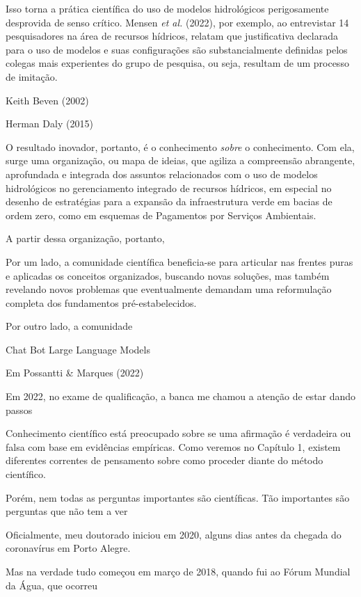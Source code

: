 \documentclass[./main.tex]{subfiles}
\begin{document}
Isso torna a prática científica do uso de modelos hidrológicos perigosamente desprovida de senso crítico. Mensen \textit{et al.} (2022), por exemplo, ao entrevistar 14 pesquisadores na área de recursos hídricos, relatam que justificativa declarada para o uso de modelos e suas configurações são substancialmente definidas pelos colegas mais experientes do grupo de pesquisa, ou seja, resultam de um processo de imitação.

Keith Beven (2002)\cite{Beven2002a}

Herman Daly (2015) \cite{Daly2015a}


O resultado inovador, portanto, é o conhecimento \textit{sobre} o conhecimento. Com ela, surge uma organização, ou mapa de ideias, que agiliza a compreensão abrangente, aprofundada e integrada dos assuntos relacionados com o uso de modelos hidrológicos no gerenciamento integrado de recursos hídricos, em especial no desenho de estratégias para a expansão da infraestrutura verde em bacias de ordem zero, como em esquemas de Pagamentos por Serviços Ambientais.

A partir dessa organização, portanto, 

Por um lado, a comunidade científica beneficia-se para articular nas frentes puras e aplicadas os conceitos organizados, buscando novas soluções, mas também revelando novos problemas que eventualmente demandam uma reformulação completa dos fundamentos pré-estabelecidos.



Por outro lado, a comunidade 


Chat Bot Large Language Models



Em Possantti \& Marques (2022) \cite{Possantti2022a}

Em 2022, no exame de qualificação, a banca me chamou a atenção de estar dando passos 



Conhecimento científico está preocupado sobre se uma afirmação é verdadeira ou falsa com base em evidências empíricas. Como veremos no Capítulo 1, existem diferentes correntes de pensamento sobre como proceder diante do método científico.

Porém, nem todas as perguntas importantes são científicas. Tão importantes são perguntas que não tem a ver

Oficialmente, meu doutorado iniciou em 2020, alguns dias antes da chegada do coronavírus em Porto Alegre. 

Mas na verdade tudo começou em março de 2018, quando fui ao Fórum Mundial da Água, que ocorreu 
\end{document}
